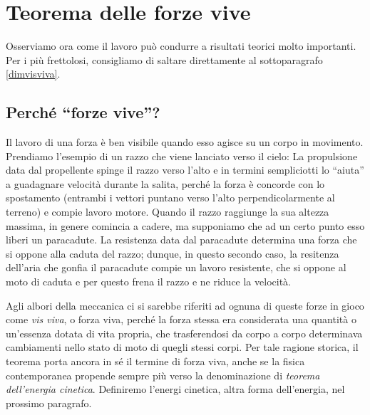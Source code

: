 






\section{Teorema delle forze vive}
Osserviamo ora come il lavoro può condurre a risultati teorici
molto importanti. Per i più frettolosi, consigliamo di saltare
direttamente al sottoparagrafo \ref{dimvisviva}.

\subsection{Perché ``forze vive''?}
Il lavoro di una forza è ben visibile quando esso agisce su un corpo
in movimento. Prendiamo l'esempio di un razzo che viene lanciato verso
il cielo: La propulsione data dal
propellente spinge il razzo verso l'alto e in termini sempliciotti lo
``aiuta'' a guadagnare velocità durante la salita, perché la forza è
concorde con lo spostamento (entrambi i vettori puntano verso l'alto
perpendicolarmente al terreno) e compie lavoro motore. Quando il razzo raggiunge la sua altezza
massima, in genere comincia a cadere, ma supponiamo che ad un certo
punto esso liberi un paracadute. La resistenza data dal paracadute
determina una forza che si oppone alla caduta del razzo; dunque, in
questo secondo caso, la resitenza dell'aria che gonfia il paracadute
compie un lavoro resistente, che si oppone al moto di caduta e per questo
frena il razzo e ne riduce la velocità.

Agli albori della meccanica ci si sarebbe riferiti ad ognuna di queste
forze in gioco come \textit{vis viva}, o forza viva, perché la forza
stessa era considerata una quantità o un'essenza dotata di vita propria,
che trasferendosi da corpo a corpo determinava cambiamenti nello stato
di moto di quegli stessi corpi. Per tale ragione storica, il teorema
porta ancora in sé il termine di forza viva, anche se la fisica
contemporanea propende sempre più verso la denominazione di
\textit{teorema dell'energia cinetica}. Definiremo l'energi cinetica,
altra forma dell'energia, nel prossimo paragrafo.

